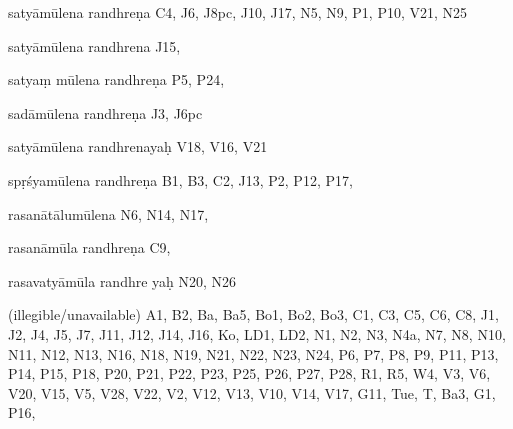 \begin{ekdosis}
\begin{marma}[hp01_055]
\begin{marma}[hp02_009]
\begin{marma}[hp02_011]
\begin{marma}[hp02_55a]
\begin{description}
    \end{description}
 \end{marma}


 \begin{marma}[hp02_56*1]
\item[satyāmūlena randhreṇa] C4, J6, J8pc, J10, J17, N5, N9, P1, P10, V21, N25
\item[satyāmūlena randhrena] J15,
\item[satyaṃ mūlena randhreṇa] P5, P24, 
\item[sadāmūlena randhreṇa] J3, J6pc
\item[satyāmūlena randhrenayaḥ] V18, V16, V21
\item[spṛśyamūlena randhreṇa] B1, B3, C2, J13, P2, P12, P17, 
\item[rasanātālumūlena] N6, N14, N17, 
\item[rasanāmūla randhreṇa] C9, 
\item[rasavatyāmūla randhre yaḥ] N20, N26
\item[]
\item[]
\item[(illegible/unavailable)] A1, B2, Ba, Ba5, Bo1, Bo2, Bo3, C1, C3, C5, C6, C8, J1, J2, J4, J5, J7, J11, J12, J14, J16, Ko, LD1, LD2, N1, N2, N3, N4a, N7, N8, N10, N11, N12, N13, N16, N18, N19, N21, N22, N23, N24, P6, P7, P8, P9, P11, P13, P14, P15, P18, P20, P21, P22, P23, P25, P26, P27, P28, R1, R5, W4, V3, V6, V20, V15, V5, V28, V22, V2, V12, V13, V10, V14, V17, G11, Tue, T, Ba3, G1, P16,
  \begin{description}

    \end{description}
 \end{marma}



\end{marma}
\end{marma}
\end{marma}
\end{ekdosis}
